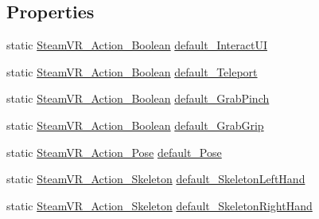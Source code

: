 \subsection*{Properties}
\begin{DoxyCompactItemize}
\item 
static \mbox{\hyperlink{class_valve_1_1_v_r_1_1_steam_v_r___action___boolean}{Steam\+V\+R\+\_\+\+Action\+\_\+\+Boolean}} \mbox{\hyperlink{class_valve_1_1_v_r_1_1_steam_v_r___actions_ab16e31f3342f652953ef3e798efda7ac}{default\+\_\+\+Interact\+UI}}
\item 
static \mbox{\hyperlink{class_valve_1_1_v_r_1_1_steam_v_r___action___boolean}{Steam\+V\+R\+\_\+\+Action\+\_\+\+Boolean}} \mbox{\hyperlink{class_valve_1_1_v_r_1_1_steam_v_r___actions_a23caf99ba559eadf758e34ac693af761}{default\+\_\+\+Teleport}}
\item 
static \mbox{\hyperlink{class_valve_1_1_v_r_1_1_steam_v_r___action___boolean}{Steam\+V\+R\+\_\+\+Action\+\_\+\+Boolean}} \mbox{\hyperlink{class_valve_1_1_v_r_1_1_steam_v_r___actions_aaca427f1e8d6bd364761a85ef0f93e41}{default\+\_\+\+Grab\+Pinch}}
\item 
static \mbox{\hyperlink{class_valve_1_1_v_r_1_1_steam_v_r___action___boolean}{Steam\+V\+R\+\_\+\+Action\+\_\+\+Boolean}} \mbox{\hyperlink{class_valve_1_1_v_r_1_1_steam_v_r___actions_a62f03f6686f3630e3ae5d733461b569e}{default\+\_\+\+Grab\+Grip}}
\item 
static \mbox{\hyperlink{class_valve_1_1_v_r_1_1_steam_v_r___action___pose}{Steam\+V\+R\+\_\+\+Action\+\_\+\+Pose}} \mbox{\hyperlink{class_valve_1_1_v_r_1_1_steam_v_r___actions_ac73df4309eb59b97f39d13405f655722}{default\+\_\+\+Pose}}
\item 
static \mbox{\hyperlink{class_valve_1_1_v_r_1_1_steam_v_r___action___skeleton}{Steam\+V\+R\+\_\+\+Action\+\_\+\+Skeleton}} \mbox{\hyperlink{class_valve_1_1_v_r_1_1_steam_v_r___actions_a265d7d1414038808a0d02543bcc27a6d}{default\+\_\+\+Skeleton\+Left\+Hand}}
\item 
static \mbox{\hyperlink{class_valve_1_1_v_r_1_1_steam_v_r___action___skeleton}{Steam\+V\+R\+\_\+\+Action\+\_\+\+Skeleton}} \mbox{\hyperlink{class_valve_1_1_v_r_1_1_steam_v_r___actions_ad3e55e54ca66aa146edfe5832c803e2f}{default\+\_\+\+Skeleton\+Right\+Hand}}

\end{DoxyCompactItemize}
